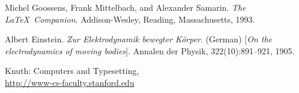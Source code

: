 \documentclass[11pt]{article}
\begin{document}
\begin{multicols}{2}
\begin{thebibliography}{100}
Michel Goossens, Frank Mittelbach, and Alexander Samarin. 
\textit{The \LaTeX\ Companion}. 
Addison-Wesley, Reading, Massachusetts, 1993.

Albert Einstein. 
\textit{Zur Elektrodynamik bewegter K{\"o}rper}. (German) 
[\textit{On the electrodynamics of moving bodies}]. 
Annalen der Physik, 322(10):891–921, 1905.

Knuth: Computers and Typesetting,
\\\url{http://www-cs-faculty.stanford.edu}

\end{thebibliography}

\end{multicols}
\end{document}
